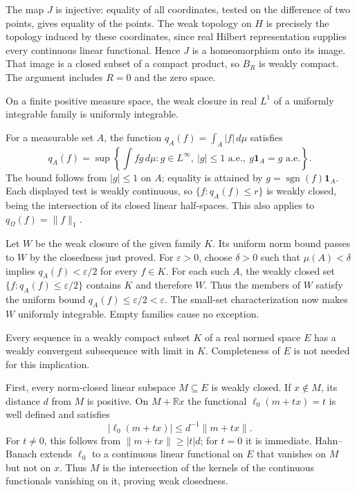 The map $J$ is injective: equality of all coordinates, tested on the
difference of two points, gives equality of the points. The weak topology
on $H$ is precisely the topology induced by these coordinates, since
real Hilbert representation supplies every continuous linear functional.
Hence $J$ is a homeomorphism onto its image. That image is a closed
subset of a compact product, so $B_R$ is weakly compact. The argument
includes $R=0$ and the zero space.
\Done

\begin{lemma}
\label{lem:UI_weak_closure}
On a finite positive measure space, the weak closure in real $L^1$ of
a uniformly integrable family is uniformly integrable.
\end{lemma}
\Proof
For a measurable set $A$, the function
$q_A(f)=\int_A|f|\,d\mu$ satisfies
\[
q_A(f)=\sup\left\{\int fg\,d\mu:
 g\in L^\infty,\ |g|\leq1\text{ a.e.},\ g\mathbf1_A=g\text{ a.e.}\right\}.
\]
The bound follows from $|g|\leq1$ on $A$; equality is attained by
$g=\operatorname{sgn}(f)\mathbf1_A$. Each displayed test is weakly
continuous, so $\{f:q_A(f)\leq r\}$ is weakly closed, being the
intersection of its closed linear half-spaces. This also applies to
$q_\Omega(f)=\|f\|_1$.

Let $W$ be the weak closure of the given family $K$. Its uniform norm
bound passes to $W$ by the closedness just proved. For $\varepsilon>0$,
choose $\delta>0$ such that $\mu(A)<\delta$ implies
$q_A(f)<\varepsilon/2$ for every $f\in K$. For each such $A$, the
weakly closed set $\{f:q_A(f)\leq\varepsilon/2\}$ contains $K$ and
therefore $W$. Thus the members of $W$ satisfy the uniform bound
$q_A(f)\leq\varepsilon/2<\varepsilon$. The small-set characterization
now makes $W$ uniformly integrable. Empty families cause no exception.
\Done

\begin{lemma}
\label{lem:weak_compact_subsequence}
Every sequence in a weakly compact subset $K$ of a real normed space
$E$ has a weakly convergent subsequence with limit in $K$.
Completeness of $E$ is not needed for this implication.
\end{lemma}
\Proof
First, every norm-closed linear subspace $M\subseteq E$ is weakly closed.
If $x\notin M$, its distance $d$ from $M$ is positive. On $M+\mathbb R x$
the functional $\ell_0(m+tx)=t$ is well defined and satisfies
\[
|\ell_0(m+tx)|\leq d^{-1}\|m+tx\|.
\]
For $t\ne0$, this follows from $\|m+tx\|\geq |t|d$; for $t=0$
it is immediate. Hahn--Banach extends $\ell_0$ to a continuous linear
functional on $E$ that vanishes on $M$ but not on $x$. Thus $M$ is the
intersection of the kernels of the continuous functionals vanishing on
it, proving weak closedness.

